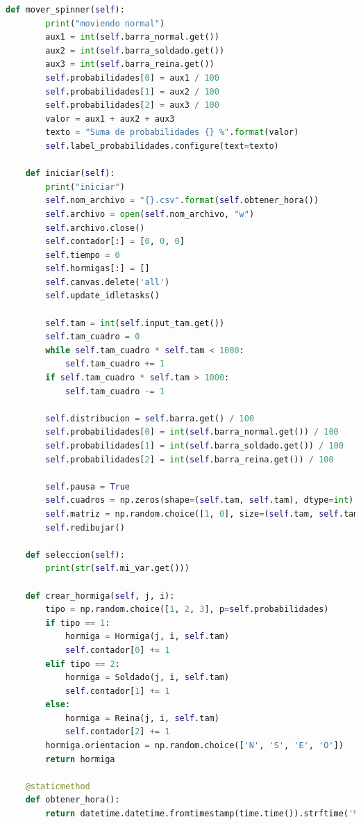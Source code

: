 \begin{lstlisting}[language=Python]
    def mover_spinner(self):
        print("moviendo normal")
        aux1 = int(self.barra_normal.get())
        aux2 = int(self.barra_soldado.get())
        aux3 = int(self.barra_reina.get())
        self.probabilidades[0] = aux1 / 100
        self.probabilidades[1] = aux2 / 100
        self.probabilidades[2] = aux3 / 100
        valor = aux1 + aux2 + aux3
        texto = "Suma de probabilidades {} %".format(valor)
        self.label_probabilidades.configure(text=texto)

    def iniciar(self):
        print("iniciar")
        self.nom_archivo = "{}.csv".format(self.obtener_hora())
        self.archivo = open(self.nom_archivo, "w")
        self.archivo.close()
        self.contador[:] = [0, 0, 0]
        self.tiempo = 0
        self.hormigas[:] = []
        self.canvas.delete('all')
        self.update_idletasks()

        self.tam = int(self.input_tam.get())
        self.tam_cuadro = 0
        while self.tam_cuadro * self.tam < 1000:
            self.tam_cuadro += 1
        if self.tam_cuadro * self.tam > 1000:
            self.tam_cuadro -= 1

        self.distribucion = self.barra.get() / 100
        self.probabilidades[0] = int(self.barra_normal.get()) / 100
        self.probabilidades[1] = int(self.barra_soldado.get()) / 100
        self.probabilidades[2] = int(self.barra_reina.get()) / 100

        self.pausa = True
        self.cuadros = np.zeros(shape=(self.tam, self.tam), dtype=int)
        self.matriz = np.random.choice([1, 0], size=(self.tam, self.tam), p=[self.distribucion, 1-self.distribucion])
        self.redibujar()

    def seleccion(self):
        print(str(self.mi_var.get()))

    def crear_hormiga(self, j, i):
        tipo = np.random.choice([1, 2, 3], p=self.probabilidades)
        if tipo == 1:
            hormiga = Hormiga(j, i, self.tam)
            self.contador[0] += 1
        elif tipo == 2:
            hormiga = Soldado(j, i, self.tam)
            self.contador[1] += 1
        else:
            hormiga = Reina(j, i, self.tam)
            self.contador[2] += 1
        hormiga.orientacion = np.random.choice(['N', 'S', 'E', 'O'])
        return hormiga

    @staticmethod
    def obtener_hora():
        return datetime.datetime.fromtimestamp(time.time()).strftime('%Y-%m-%d_%H:%M:%S')


\end{lstlisting}
